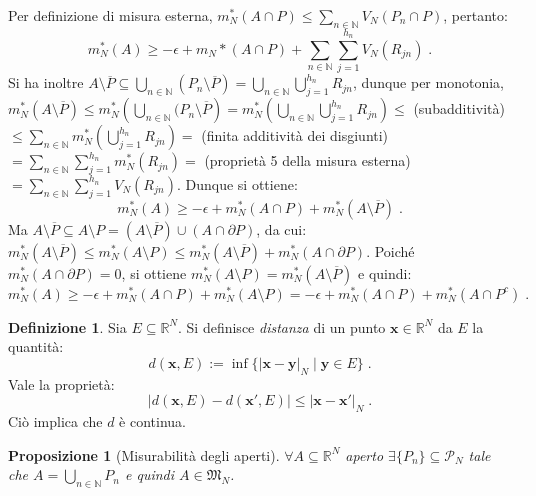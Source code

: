 \documentclass[a4paper,12pt]{report}
\theoremstyle{plain}
\newtheorem{prop}{Proposizione}[section]
\theoremstyle{definition}
\newtheorem{defn}{Definizione}[section]
\theoremstyle{remark}
\numberwithin{equation}{section}
\begin{document}
Per definizione di misura esterna, $m_N^*(A\cap P) \le \sum_{n \in \mathbb{N}} V_N(P_n \cap P)$, pertanto:
\begin{equation}
m_N^*(A)\ge -\epsilon +m_N*(A\cap P)+\sum_{n \in \mathbb{N}}\sum_{j=1}^{h_n} V_N(R_{jn})\;.
\end{equation}
Si ha inoltre $A \setminus \overline{P} \subseteq \bigcup_{n \in \mathbb{N}} (P_n\setminus \overline{P})=\bigcup_{n \in \mathbb{N}}
\bigcup_{j=1}^{h_n} R_{jn}$, dunque per monotonia, $m_N^*(A \setminus \overline{P}) \le m_N^*\left(\bigcup_{n \in \mathbb{N}}(P_n\setminus\overline{P}\right)=m_N^*\left(\bigcup_{n\in \mathbb{N}}\bigcup_{j=1}^{h_n} R_{jn}\right)\le$ (subadditività) $\le \sum_{n \in \mathbb{N}}m_N^*\left(\bigcup_{j=1}^{h_n} R_{jn}\right)=$ (finita additività dei disgiunti) $=\sum_{n \in \mathbb{N}}\sum_{j=1}^{h_n} m_N^*(R_{jn})=$ (proprietà 5 della misura esterna) $=\sum_{n \in\mathbb{N}}\sum_{j=1}^{h_n} V_N(R_{jn})$. Dunque si ottiene:
\begin{equation}
m_N^*(A) \ge -\epsilon +m_N^*(A\cap P)+m_N^*(A\setminus \overline{P})\;.
\end{equation}
Ma $A\setminus \overline{P} \subseteq A\setminus P=(A\setminus \overline{P})\cup (A\cap \partial P)$, da cui: $m_N^*(A\setminus\overline{P})\le m_N^*(A\setminus P) \le m_N^*(A\setminus \overline{P})+m_N^*(A\cap \partial P)$. Poiché $m_N^*(A\cap \partial P)=0$, si ottiene $m_N^*(A\setminus P)=m_N^*(A \setminus \overline{P})$ e quindi:
\begin{equation}
m_N^*(A) \ge -\epsilon+m_N^*(A\cap P)+m_N^*(A\setminus P)=-\epsilon+m_N^*(A\cap P)+m_N^*(A\cap P^c)\;.
\end{equation}
\endproof
\begin{defn} Sia $E \subseteq \mathbb{R}^N$. Si definisce \textit{distanza} di un punto $\mathbf{x}\in \mathbb{R}^N$ da $E$ la quantità:
\begin{equation}
d(\mathbf{x},E):=\inf\{|\mathbf{x}-\mathbf{y}|_N\;|\;\mathbf{y} \in E\}\;.
\end{equation}
Vale la proprietà:
\begin{equation}
|d(\mathbf{x},E)-d(\mathbf{x}',E)|\le |\mathbf{x}-\mathbf{x}'|_N\;.
\end{equation}
Ciò implica che $d$ è continua.
\end{defn}
\begin{prop}[Misurabilità degli aperti] $\forall A \subseteq \mathbb{R}^N$ aperto $\exists\{P_n\} \subseteq \mathcal{P}_N$ tale che $A=\bigcup_{n \in \mathbb{N}} P_n$ e quindi $A \in \mathfrak{M}_N$.
\end{prop}
\end{document}
